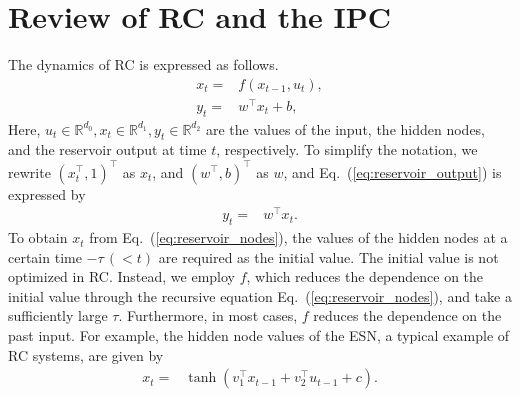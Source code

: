 \documentclass{article}
\begin{document}
\section{Review of RC and the IPC}  %
\begin{comment}
・レザバーとは何か軽く説明。オルテガを参考にして書く。
・レザバーのダイナミクス、コスト関数と最適化法を式で書く。
・普遍性がある。性能はそこそこだが、計算はすぐ終わる。
\end{comment}
The dynamics of RC is expressed as follows. 
\begin{align}
 x_t =& f(x_{t-1}, u_t),
 \label{eq:reservoir_nodes} \\
 y_t =& w^\top x_t + b,
 \label{eq:reservoir_output}
\end{align}
Here, $u_t \in \mathbb{R}^{d_0}, x_t \in \mathbb{R}^{d_1}, y_t \in \mathbb{R}^{d_2}$ are the values of the input, the hidden nodes, and the reservoir output at time $t$, respectively. 
To simplify the notation, we rewrite $(x_t^\top, 1)^\top$ as $x_t$, and $(w^\top, b)^\top$ as $w$, and Eq.~(\ref{eq:reservoir_output}) is expressed by 
\begin{align}
 y_t =& w^\top x_t.
 \label{eq:reservoir_output_2}
\end{align}
To obtain $x_t$ from Eq.~(\ref{eq:reservoir_nodes}), the values of the hidden nodes at a certain time $-\tau \, (< t)$ are required as the initial value. 
The initial value is not optimized in RC. 
Instead, we employ $f$, which reduces the dependence on the initial value through the recursive equation Eq.~(\ref{eq:reservoir_nodes}), and take a sufficiently large $\tau$. 
Furthermore, in most cases, $f$ reduces the dependence on the past input. 
For example, the hidden node values of the ESN, a typical example of RC systems, are given by~\cite{jaeger2002tutorial} 
\begin{align}
 x_t =& \tanh(v_1^\top x_{t-1} + v_2^\top u_{t-1} + c).
 \label{eq:ESN_nodes}
\end{align}
\end{document}
